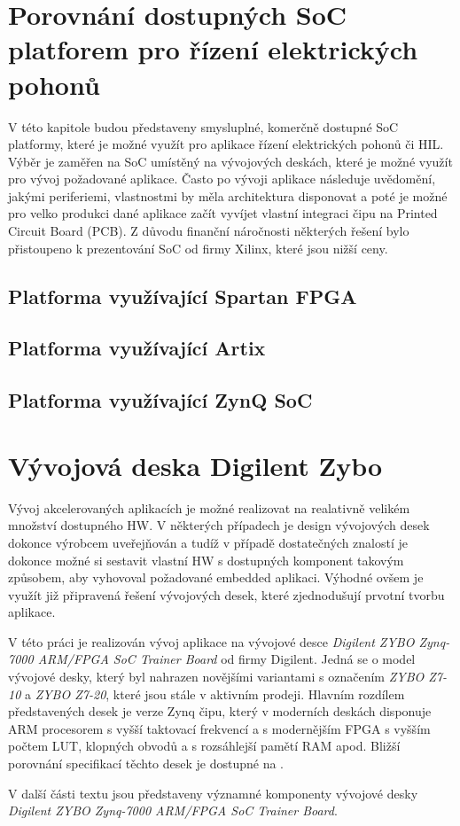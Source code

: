 \documentclass[a4paper, twoside, 11pt]{article}
\begin{document}
	\section{Porovnání dostupných SoC platforem pro řízení elektrických pohonů}
			V této kapitole budou představeny smysluplné, komerčně dostupné SoC platformy, které je možné využít pro aplikace řízení elektrických pohonů či HIL. Výběr je zaměřen na SoC umístěný na vývojových deskách, které je možné využít pro vývoj požadované aplikace. Často po vývoji aplikace následuje uvědomění, jakými periferiemi, vlastnostmi by měla architektura disponovat a poté je možné pro velko produkci dané aplikace začít vyvíjet vlastní integraci čipu na Printed Circuit Board (PCB). Z důvodu finanční náročnosti některých řešení bylo přistoupeno k prezentování SoC od firmy Xilinx, které jsou nižší ceny.

			\subsection{Platforma využívající Spartan FPGA}

			\subsection{Platforma využívající Artix}

			\subsection{Platforma využívající ZynQ SoC}


	\section{Vývojová deska Digilent Zybo}
			Vývoj akcelerovaných aplikacích je možné realizovat na realativně velikém množství dostupného HW. V některých případech je design vývojových desek dokonce výrobcem uveřejňován a tudíž v případě dostatečných znalostí je dokonce možné si sestavit vlastní HW s dostupných komponent takovým způsobem, aby vyhovoval požadované embedded aplikaci. Výhodné ovšem je využít již připravená řešení vývojových desek, které zjednodušují prvotní tvorbu aplikace.\par
			V této práci je realizován vývoj aplikace na vývojové desce \textit{Digilent ZYBO Zynq-7000 ARM/FPGA SoC Trainer Board} od firmy Digilent. \cite{digilent-zybo-7000-docs} Jedná se o model vývojové desky, který byl nahrazen novějšími variantami s označením \textit{ZYBO Z7-10} a \textit{ZYBO Z7-20}, které jsou stále v aktivním prodeji. Hlavním rozdílem představených desek je verze Zynq čipu, který v moderních deskách disponuje ARM procesorem s vyšší taktovací frekvencí a s modernějším FPGA s vyšším počtem LUT, klopných obvodů a s rozsáhlejší pamětí RAM apod. Bližší porovnání specifikací těchto desek je dostupné na \cite{digilent-zybo-compare}.\par
			V další části textu jsou představeny významné komponenty vývojové desky \textit{Digilent ZYBO Zynq-7000 ARM/FPGA SoC Trainer Board}.
\end{document}
